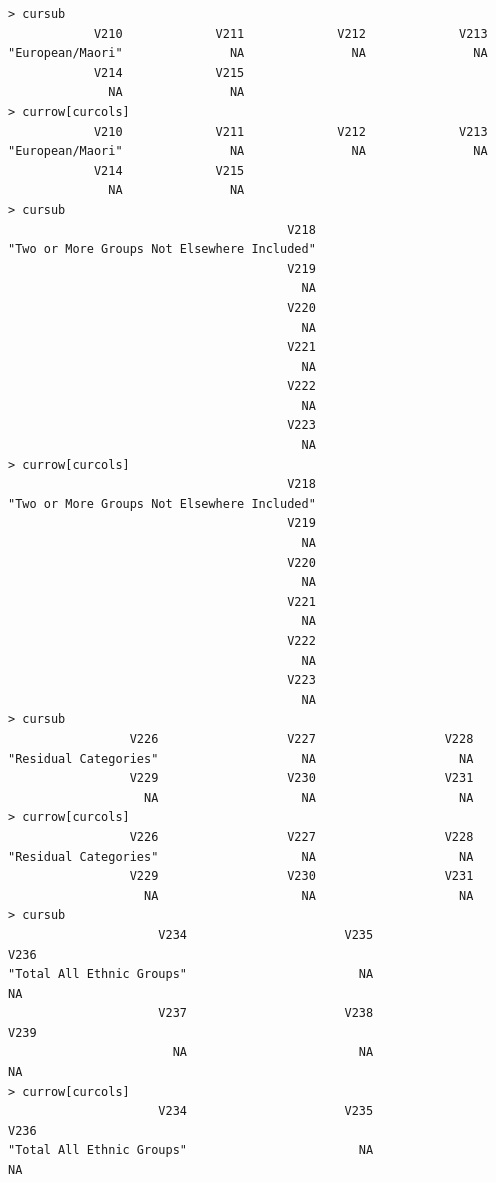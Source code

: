 \documentclass[a4paper]{article}
\begin{document}
\begin{verbatim}
> cursub 
            V210             V211             V212             V213 
"European/Maori"               NA               NA               NA 
            V214             V215 
              NA               NA 
> currow[curcols] 
            V210             V211             V212             V213 
"European/Maori"               NA               NA               NA 
            V214             V215 
              NA               NA 
> cursub 
                                       V218 
"Two or More Groups Not Elsewhere Included" 
                                       V219 
                                         NA 
                                       V220 
                                         NA 
                                       V221 
                                         NA 
                                       V222 
                                         NA 
                                       V223 
                                         NA 
> currow[curcols] 
                                       V218 
"Two or More Groups Not Elsewhere Included" 
                                       V219 
                                         NA 
                                       V220 
                                         NA 
                                       V221 
                                         NA 
                                       V222 
                                         NA 
                                       V223 
                                         NA 
> cursub 
                 V226                  V227                  V228 
"Residual Categories"                    NA                    NA 
                 V229                  V230                  V231 
                   NA                    NA                    NA 
> currow[curcols] 
                 V226                  V227                  V228 
"Residual Categories"                    NA                    NA 
                 V229                  V230                  V231 
                   NA                    NA                    NA 
> cursub 
                     V234                      V235                      V236 
"Total All Ethnic Groups"                        NA                        NA 
                     V237                      V238                      V239 
                       NA                        NA                        NA 
> currow[curcols] 
                     V234                      V235                      V236 
"Total All Ethnic Groups"                        NA                        NA 

\end{verbatim}
\end{document}
